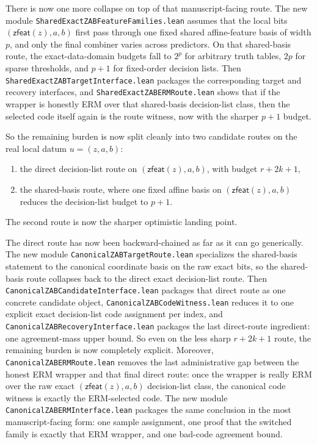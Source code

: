 \documentclass[11pt]{article}
\theoremstyle{remark}
\begin{document}
There is now one more collapse on top of that manuscript-facing route.  The new
module \texttt{SharedExactZABFeatureFamilies.lean} assumes that the local bits
\((\mathsf{zfeat}(z),a,b)\) first pass through one fixed shared affine-feature
basis of width \(p\), and only the final combiner varies across predictors.  On
that shared-basis route, the exact-data-domain budgets fall to \(2^p\) for arbitrary
truth tables, \(2p\) for sparse thresholds, and \(p+1\) for fixed-order
decision lists.  Then \texttt{SharedExactZABTargetInterface.lean} packages the
corresponding target and recovery interfaces, and
\texttt{SharedExactZABERMRoute.lean} shows that if the wrapper is honestly ERM
over that shared-basis decision-list class, then the selected code itself again
is the route witness, now with the sharper \(p+1\) budget.

So the remaining burden is now split cleanly into two candidate routes on the
real local datum \(u=(z,a,b)\):
\begin{enumerate}[leftmargin=1.5em]
  \item the direct decision-list route on \((\mathsf{zfeat}(z),a,b)\), with budget \(r+2k+1\),
  \item the shared-basis route, where one fixed affine basis on \((\mathsf{zfeat}(z),a,b)\) reduces the decision-list budget to \(p+1\).
\end{enumerate}
The second route is now the sharper optimistic landing point.

The direct route has now been backward-chained as far as it can go generically.
The new module \texttt{CanonicalZABTargetRoute.lean} specializes the
shared-basis statement to the canonical coordinate basis on the raw exact bits,
so the shared-basis route collapses back to the direct exact decision-list
route.  Then \texttt{CanonicalZABCandidateInterface.lean} packages that direct
route as one concrete candidate object, \texttt{CanonicalZABCodeWitness.lean}
reduces it to one explicit exact decision-list code assignment per index, and
\texttt{CanonicalZABRecoveryInterface.lean} packages the last direct-route
ingredient: one agreement-mass upper bound.  So even on the less sharp
\(r+2k+1\) route, the remaining burden is now completely explicit.  Moreover,
\texttt{CanonicalZABERMRoute.lean} removes the last administrative gap between
the honest ERM wrapper and that final direct route: once the wrapper is really
ERM over the raw exact \((\mathsf{zfeat}(z),a,b)\) decision-list class, the
canonical code witness is exactly the ERM-selected code.  The new module
\texttt{CanonicalZABERMInterface.lean} packages the same conclusion in the most
manuscript-facing form: one sample assignment, one proof that the switched
family is exactly that ERM wrapper, and one bad-code agreement bound.
\end{document}
